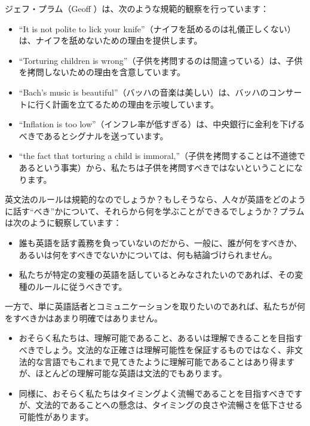 ジェフ・プラム（Geoff \textcite[205]{Pullum2019}）は、次のような規範的観察を行っています：
\begin{itemize}[noitemsep]
    \item \enquote{It is not polite to lick your knife}（ナイフを舐めるのは礼儀正しくない）は、ナイフを舐めないための理由を提供します。
    \item \enquote{Torturing children is wrong}（子供を拷問するのは間違っている）は、子供を拷問しないための理由を含意しています。
    \item \enquote{Bach's music is beautiful}（バッハの音楽は美しい）は、バッハのコンサートに行く計画を立てるための理由を示唆しています。
    \item \enquote{Inflation is too low}（インフレ率が低すぎる）は、中央銀行に金利を下げるべきであるとシグナルを送っています。
    \item \enquote{the fact that torturing a child is immoral,}（子供を拷問することは不道徳であるという事実）から、私たちは子供を拷問すべきではないということになります。
\end{itemize}

英文法のルールは規範的なのでしょうか？もしそうなら、人々が英語をどのように話す\enquote{べき}かについて、それらから何を学ぶことができるでしょうか？プラムは次のように観察しています：
\begin{itemize}[noitemsep]
    \item 誰も英語を話す義務を負っていないのだから、一般に、誰が何をすべきか、あるいは何をすべきでないかについては、何も結論づけられません。
    \item 私たちが特定の変種の英語を話しているとみなされたいのであれば、その変種のルールに従うべきです。
\end{itemize}

一方で、単に英語話者とコミュニケーションを取りたいのであれば、私たちが何をすべきかはあまり明確ではありません。

\begin{itemize}[noitemsep]
    \item おそらく私たちは、理解可能であること、あるいは理解できることを目指すべきでしょう。文法的な正確さは理解可能性を保証するものではなく、非文法的な言語でもこれまで見てきたように理解可能であることはあり得ますが、ほとんどの理解可能な英語は文法的でもあります。
    \item 同様に、おそらく私たちはタイミングよく流暢であることを目指すべきですが、文法的であることへの懸念は、タイミングの良さや流暢さを低下させる可能性があります。
\end{itemize}

